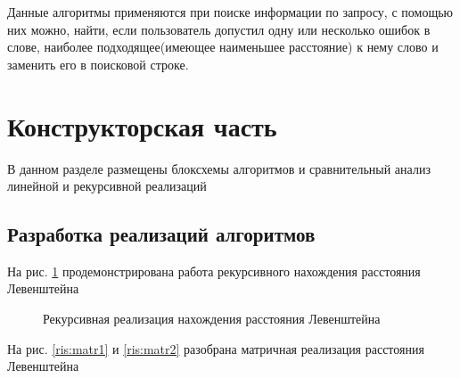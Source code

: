 \documentclass[a4paper, 14pt]{article}
\begin{document}
	Данные алгоритмы применяются при поиске информации по запросу, с помощью них можно, найти, если пользователь допустил одну или несколько ошибок в слове, наиболее подходящее(имеющее наименьшее расстояние) к нему слово и заменить его в поисковой строке.  

	
		\newpage
	\section{Конструкторская часть}
	В данном разделе размещены блоксхемы алгоритмов и сравнительный анализ линейной и рекурсивной реализаций
	\subsection{Разработка реализаций алгоритмов}
	
	На рис. \ref{ris:rec} продемонстрирована работа рекурсивного нахождения расстояния Левенштейна


\begin{figure}[ht!]
\caption{Рекурсивная реализация нахождения расстояния Левенштейна}
\label{ris:rec}
\end{figure}

	На рис. \ref{ris:matr1} и \ref{ris:matr2} разобрана матричная реализация расстояния Левенштейна
\end{document}
